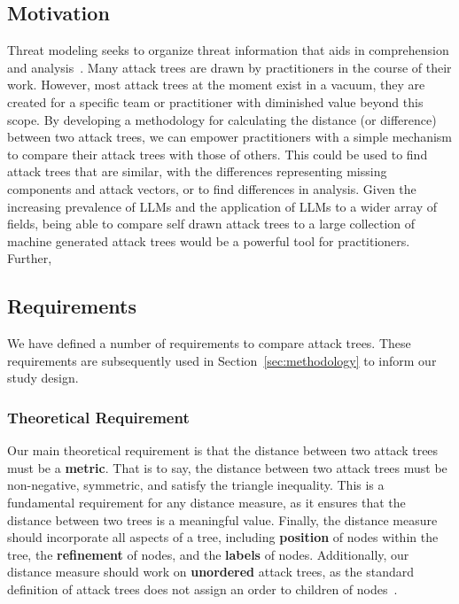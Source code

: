 \subsection{Motivation}


Threat modeling seeks to organize threat information that aids in comprehension and analysis~\cite{andersonSecurityEngineeringGuide2020,schneierSecretsLiesDigital2000}. Many attack trees are drawn by practitioners in the course of their work. However, most attack trees at the moment exist in a vacuum, they are created for a specific team or practitioner with diminished value beyond this scope. By developing a methodology for calculating the distance (or difference) between two attack trees, we can empower practitioners with a simple mechanism to compare their attack trees with those of others. This could be used to find attack trees that are similar, with the differences representing missing components and attack vectors, or to find differences in analysis. Given the increasing prevalence of LLMs and the application of LLMs to a wider array of fields, being able to compare self drawn attack trees to a large collection of machine generated attack trees would be a powerful tool for practitioners. Further,



\subsection{Requirements}
\label{ssec:requirements}

We have defined a number of requirements to compare attack trees. These requirements are subsequently used in Section~\ref{sec:methodology} to inform our study design.

\subsubsection{Theoretical Requirement}

Our main theoretical requirement is that the distance between two attack trees must be a \textbf{metric}. That is to say, the distance between two attack trees must be non-negative, symmetric, and satisfy the triangle inequality. This is a fundamental requirement for any distance measure, as it ensures that the distance between two trees is a meaningful value. Finally, the distance measure should incorporate all aspects of a tree, including \textbf{position} of nodes within the tree, the \textbf{refinement} of nodes, and the \textbf{labels} of nodes. Additionally, our distance measure should work on \textbf{unordered} attack trees, as the standard definition of attack trees does not assign an order to children of nodes~\cite{mauw_foundations_2006}.


